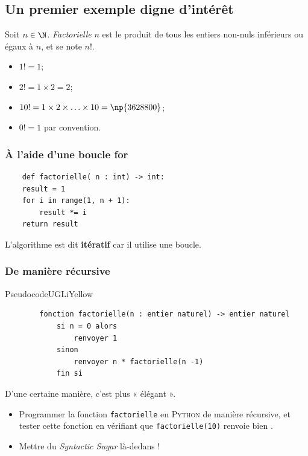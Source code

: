 \documentclass[10pt,firamath,cours]{nsi}
\begin{document}
%


\subsection{Un premier exemple digne d'intérêt}
Soit $n\in\N$. \textit{Factorielle} $n$ est le produit de tous les entiers non-nuls inférieurs ou égaux à $n$, et se note $n!$.
\begin{itemize}
    \item $1!=1$;
    \item $2!=1\times2 = 2$;
    \item $10!=1\times 2\times \ldots \times 10 = \np{3628800}$;
    \item $0! = 1$ par convention.
\end{itemize}


%

\subsubsection{À l'aide d'une boucle for}
\begin{pyc}
    \begin{verbatim}
    def factorielle( n : int) -> int:
    result = 1
    for i in range(1, n + 1):
        result *= i
    return result      
    \end{verbatim}
\end{pyc}

L'algorithme est dit \textbf{itératif} car il utilise une boucle.


%

\subsubsection{De manière récursive}


\begin{encadrecolore}{Pseudocode}{UGLiYellow}
    \begin{verbatim}
        fonction factorielle(n : entier naturel) -> entier naturel
            si n = 0 alors
                renvoyer 1
            sinon
                renvoyer n * factorielle(n -1)
            fin si
        \end{verbatim}
\end{encadrecolore}

D'une certaine manière, c'est plus « élégant ».


\begin{exercice}
    \begin{itemize}
        \item   Programmer la fonction \texttt{factorielle} en \textsc{Python} de manière récursive, et tester cette fonction en vérifiant que  \texttt{factorielle(10)} renvoie bien .
        \item   Mettre du \textit{Syntactic Sugar} là-dedans !
    \end{itemize}
\end{exercice}
\end{document}
